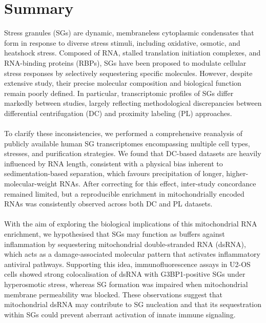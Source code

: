\chapter*{Summary}

Stress granules (SGs) are dynamic, membraneless cytoplasmic condensates that form in response to diverse stress stimuli, including oxidative, osmotic, and heatshock stress. Composed of RNA, stalled translation initiation complexes, and RNA-binding proteins (RBPs), SGs have been proposed to modulate cellular stress responses by selectively sequestering specific molecules. However, despite extensive study, their precise molecular composition and biological function remain poorly defined. In particular, transcriptomic profiles of SGs differ markedly between studies, largely reflecting methodological discrepancies between differential centrifugation (DC) and proximity labeling (PL) approaches.
\\
\\
To clarify these inconsistencies, we performed a comprehensive reanalysis of publicly available human SG transcriptomes encompassing multiple cell types, stresses, and purification strategies. We found that DC-based datasets are heavily influenced by RNA length, consistent with a physical bias inherent to sedimentation-based separation, which favours precipitation of longer, higher-molecular-weight RNAs. After correcting for this effect, inter-study concordance remained limited, but a reproducible enrichment in mitochondrially encoded RNAs was consistently observed across both DC and PL datasets.
\\
\\
With the aim of exploring the biological implications of this mitochondrial RNA enrichment, we hypothesised that SGs may function as buffers against inflammation by sequestering mitochondrial double-stranded RNA (dsRNA), which acts as a damage-associated molecular pattern that activates inflammatory antiviral pathways. Supporting this idea, immunofluorescence assays in U2-OS cells showed strong colocalisation of dsRNA with G3BP1-positive SGs under hyperosmotic stress, whereas SG formation was impaired when mitochondrial membrane permeability was blocked. These observations suggest that mitochondrial dsRNA may contribute to SG nucleation and that its sequestration within SGs could prevent aberrant activation of innate immune signaling.
\\
\\
